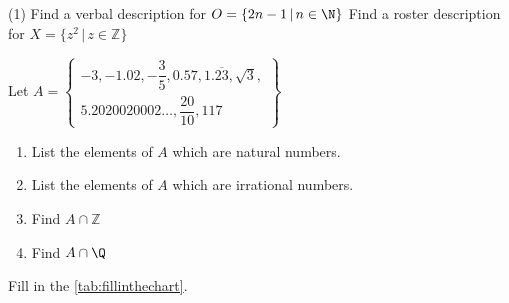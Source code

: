 \label{ExercisesforAppSetTheory}

\begin{tasks}(1)
\task Find a verbal description for $O = \{ 2n-1 \, | \, n \in \N\}$
\task Find a roster description for $X = \{ z^2 \, | \, z \in \mathbb{Z}\}$

\task Let $A = \left\{ \begin{multlined} -3, -1.02, -\dfrac{3}{5}, 0.57, 1.\overline{23}, \sqrt{3}, \\ 5.2020020002 \ldots, \dfrac{20}{10}, 117 \end{multlined}  \right\} $

\begin{enumerate}[label=(\alph*)]

\item  List the elements of $A$ which are natural numbers.
\item  List the elements of $A$ which are irrational numbers.
\item  Find $A \cap \mathbb{Z}$
\item  Find $A \cap \Q$

\end{enumerate}

\task Fill in the \autoref{tab:fillinthechart}.

\end{tasks}

